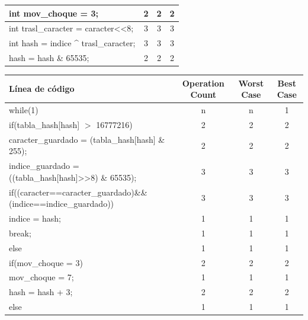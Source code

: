 \documentclass[letterpaper]{article}
\begin{document}
\begin{tabular}{|l|c|c|c|}
\hline
\hspace{1.5cm} int mov\_choque = 3; & 2 & 2 & 2 \\ 
\hline
\hspace{1.5cm} int trasl\_caracter = caracter\textless\textless 8; & 3 & 3 & 3 \\ 
\hline
\hspace{1.5cm} int hash = indice \^{} trasl\_caracter; & 3 & 3 & 3 \\ 
\hline
\hspace{1.5cm} hash = hash \& 65535; & 2 & 2 & 2 \\ 
\hline
\end{tabular}

\begin{tabular}{|l|c|c|c|}
\hline 
Línea de código & Operation Count & Worst Case & Best Case \\ 
\hline 
\hspace{1.5cm} while(1) & n & n & 1 \\ 
\hline
\hspace{2cm} if(tabla\_hash[hash] $>$ 16777216) & 2 & 2 & 2 \\ 
\hline 
\hspace{2.5cm} caracter\_guardado = (tabla\_hash[hash] \& 255); & 2 & 2 & 2 \\ 
\hline
\hspace{2.5cm} indice\_guardado = ((tabla\_hash[hash]\textgreater\textgreater 8) \& 65535); & 3 & 3 & 3 \\ 
\hline
\hspace{2.5cm} if((caracter==caracter\_guardado)\&\&(indice==indice\_guardado)) & 3 & 3 & 3 \\ 
\hline
\hspace{3cm} indice = hash; & 1 & 1 & 1 \\ 
\hline
\hspace{3cm} break; & 1 & 1 & 1 \\ 
\hline
\hspace{2.5cm} else & 1 & 1 & 1 \\ 
\hline
\hspace{3cm} if(mov\_choque = 3) & 2 & 2 & 2 \\ 
\hline
\hspace{3.5cm} mov\_choque = 7; & 1 & 1 & 1 \\ 
\hline
\hspace{3.5cm} hash = hash + 3; & 2 & 2 & 2 \\ 
\hline
\hspace{3cm} else & 1 & 1 & 1 \\ 

\end{tabular}
\end{document}
